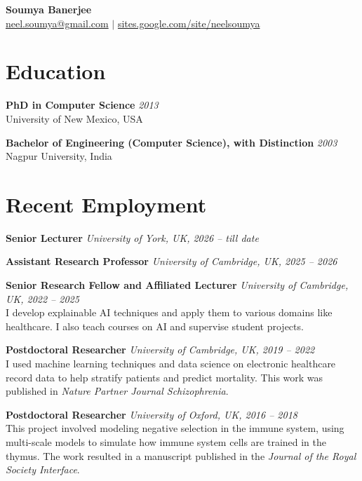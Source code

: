 \documentclass[11pt,a4paper]{article}
\newcommand{\entry}[3]{%
  \noindent\textbf{#1} \hfill \textit{#2}\\
  #3\par\smallskip
}
\begin{document}
\begin{center}
  {\huge\bfseries\color{cvblue} Soumya Banerjee}\\[0.4em]
  \href{mailto:neel.soumya@gmail.com}{neel.soumya@gmail.com} \quad $\vert$ \quad
  \href{https://sites.google.com/site/neelsoumya/}{sites.google.com/site/neelsoumya}
\end{center}

\vspace{0.5em}

\section*{Education}

\entry{PhD in Computer Science}{2013}{University of New Mexico, USA}
\entry{Bachelor of Engineering (Computer Science), with Distinction}{2003}{Nagpur University, India}

\section*{Recent Employment}

\entry{Senior Lecturer}{University of York, UK, 2026 -- till date}{}

\entry{Assistant Research Professor}{University of Cambridge, UK, 2025 -- 2026}{}

\entry{Senior Research Fellow and Affiliated Lecturer}{University of Cambridge, UK, 2022 -- 2025}{
I develop explainable AI techniques and apply them to various domains like healthcare. I also teach courses on AI and supervise student projects.}

\entry{Postdoctoral Researcher}{University of Cambridge, UK, 2019 -- 2022}{
I used machine learning techniques and data science on electronic healthcare record data to help stratify patients and predict mortality. This work was published in \textit{Nature Partner Journal Schizophrenia}.}

\entry{Postdoctoral Researcher}{University of Oxford, UK, 2016 -- 2018}{
This project involved modeling negative selection in the immune system, using multi-scale models to simulate how immune system cells are trained in the thymus. The work resulted in a manuscript published in the \textit{Journal of the Royal Society Interface}.}
\end{document}

